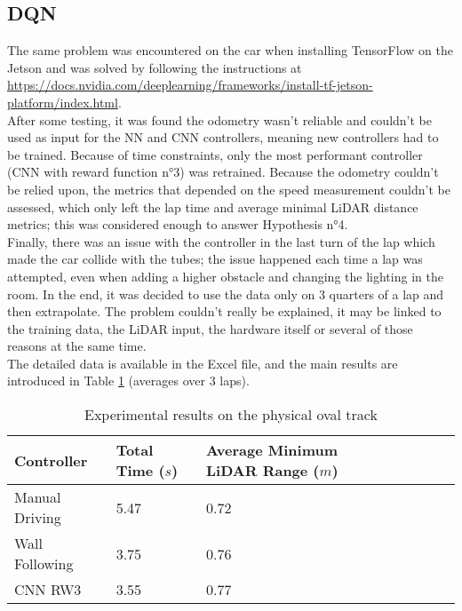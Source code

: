 \subsection{DQN}
The same problem was encountered on the car when installing TensorFlow on the Jetson and was solved by following the instructions at \url{https://docs.nvidia.com/deeplearning/frameworks/install-tf-jetson-platform/index.html}. \\
After some testing, it was found the odometry wasn't reliable and couldn't be used as input for the NN and CNN controllers, meaning new controllers had to be trained. Because of time constraints, only the most performant controller (CNN with reward function n°3) was retrained. Because the odometry couldn't be relied upon, the metrics that depended on the speed measurement couldn't be assessed, which only left the lap time and average minimal LiDAR distance metrics; this was considered enough to answer Hypothesis n°4. \\
Finally, there was an issue with the controller in the last turn of the lap which made the car collide with the tubes; the issue happened each time a lap was attempted, even when adding a higher obstacle and changing the lighting in the room. In the end, it was decided to use the data only on 3 quarters of a lap and then extrapolate. The problem couldn't really be explained, it may be linked to the training data, the LiDAR input, the hardware itself or several of those reasons at the same time. \\
The detailed data is available in the Excel file, and the main results are introduced in Table \ref{hyp4} (averages over 3 laps). 

\begin{table}[H]
\centering
\begin{tabularx}{\textwidth}{||X|X|X|X|X|X|X||} 
\hline
 Controller & Total Time ($s$) & Average Minimum LiDAR Range ($m$)\\ [0.5ex] 
 \hline\hline
 Manual Driving & 5.47 & 0.72 \\[0.5ex] 
 \hline
 Wall Following & 3.75 & 0.76\\[0.5ex] 
 \hline
CNN RW3 & 3.55 & 0.77\\[0.5ex] 
 \hline
\end{tabularx}
\caption{Experimental results on the physical oval track}
\label{hyp4}
\end{table}

